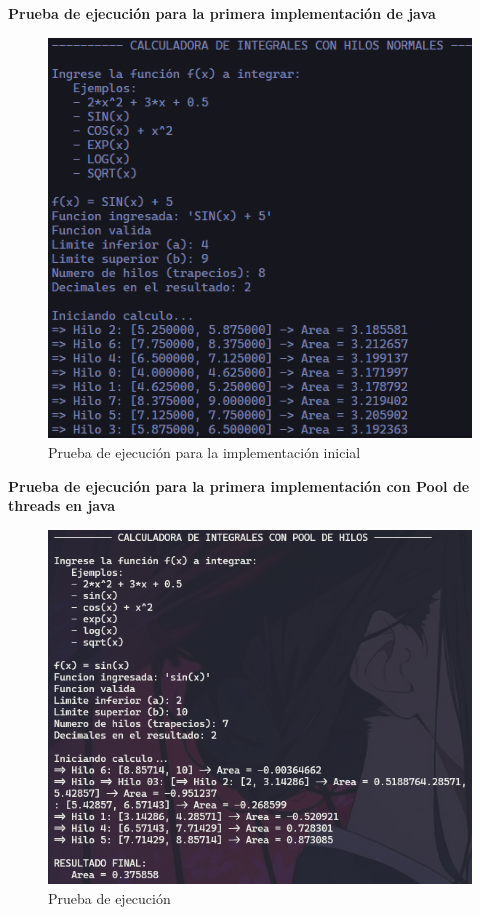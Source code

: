\textbf{Prueba de ejecución para la primera implementación de java}

\begin{figure}[H]
    \centering
    \includegraphics[width=0.8\linewidth]{img/java_prueba_hilo_1.png}
    \caption{Prueba de ejecución para la implementación inicial}
    \label{fig:placeholder}
\end{figure}

\textbf{Prueba de ejecución para la primera implementación con Pool de threads en java}

\begin{figure}[H]
    \centering
    \includegraphics[width=0.8\linewidth]{img/java_prueba_pool_1.png}
    \caption{Prueba de ejecución}
    \label{fig:placeholder}
\end{figure}

